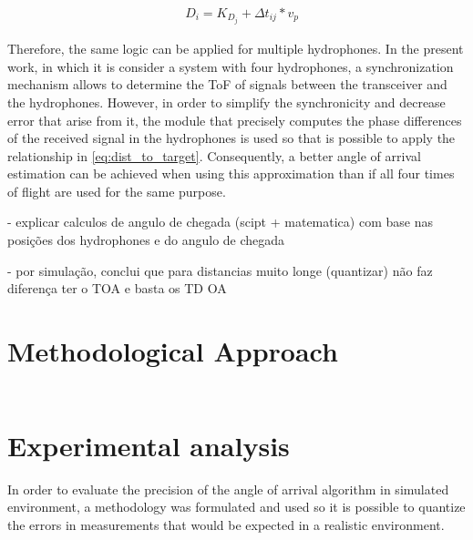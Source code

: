 \begin{eqnarray}
& D_i = K_{D_j} + \Delta t_{ij} * v_p
\label{eq:dist_to_target}
\end{eqnarray}

Therefore, the same logic can be applied for multiple hydrophones. In the present work, in which it is consider a system with four hydrophones, a synchronization mechanism allows to determine the ToF of signals between the transceiver and the hydrophones. However, in order to simplify the synchronicity and decrease error that arise from it, the module that precisely computes the phase differences of the received signal in the hydrophones is used so that is possible to apply the relationship in \ref{eq:dist_to_target}. Consequently, a better angle of arrival estimation can be achieved when using this approximation than if all four times of flight are used for the same purpose. 


- explicar calculos de angulo de chegada (scipt + matematica) com base nas posições dos hydrophones e do angulo de chegada

- por simulação, conclui que para distancias muito longe (quantizar) não faz diferença ter o TOA e basta os TD OA

\section{Methodological Approach}

\begin{eqnarray}
& 
\label{eq:}
\end{eqnarray}

\section{Experimental analysis}

In order to evaluate the precision of the angle of arrival algorithm in simulated environment, a methodology was formulated and used so it is possible to quantize the errors in measurements that would be expected in a realistic environment.